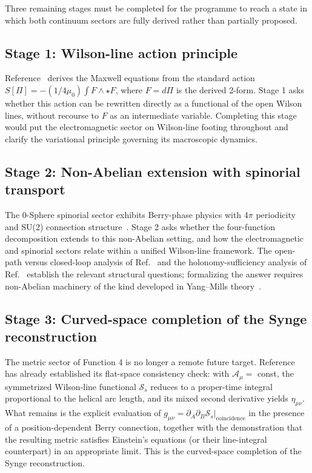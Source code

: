 \documentclass[%
 reprint, amsmath,amssymb, aps, prb, ]{revtex4-2}
\numberwithin{equation}{section}
\newcommand{\hodge}{\star}
\begin{document}
Three remaining stages must be completed for the programme to reach a state in which both continuum sectors are fully derived rather than partially proposed.

\subsection{Stage 1: Wilson-line action principle}

Reference~\cite{hanamura54} derives the Maxwell equations from the standard action $S[\Pi] = -(1/4\mu_0)\int F \wedge \hodge F$, where $F = d\Pi$ is the derived 2-form. Stage 1 asks whether this action can be rewritten directly as a functional of the open Wilson lines, without recourse to $F$ as an intermediate variable. Completing this stage would put the electromagnetic sector on Wilson-line footing throughout and clarify the variational principle governing its macroscopic dynamics.

\subsection{Stage 2: Non-Abelian extension with spinorial transport}

The 0-Sphere spinorial sector exhibits Berry-phase physics with 4$\pi$ periodicity and SU(2) connection structure~\cite{hanamura26, hanamura29, hanamura45}. Stage 2 asks whether the four-function decomposition extends to this non-Abelian setting, and how the electromagnetic and spinorial sectors relate within a unified Wilson-line framework. The open-path versus closed-loop analysis of Ref.~\cite{hanamura43} and the holonomy-sufficiency analysis of Ref.~\cite{hanamura45} establish the relevant structural questions; formalizing the answer requires non-Abelian machinery of the kind developed in Yang--Mills theory~\cite{YangMills1954}.

\subsection{Stage 3: Curved-space completion of the Synge reconstruction}

The metric sector of Function 4 is no longer a remote future target. Reference~\cite{hanamura51} has already established its flat-space consistency check: with $\mathcal{A}_\mu = $ const, the symmetrized Wilson-line functional $\mathcal{S}_s$ reduces to a proper-time integral proportional to the helical arc length, and its mixed second derivative yields $\eta_{\mu\nu}$. What remains is the explicit evaluation of $g_{\mu\nu} = \partial_A\partial_B\mathcal{S}_s|_{\text{coincidence}}$ in the presence of a position-dependent Berry connection, together with the demonstration that the resulting metric satisfies Einstein's equations (or their line-integral counterpart) in an appropriate limit. This is the curved-space completion of the Synge reconstruction.
\end{document}
